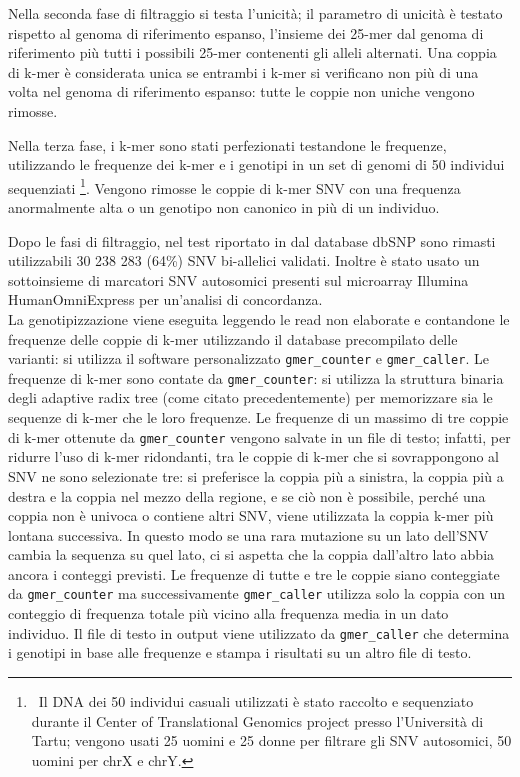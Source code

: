 \documentclass[../main.tex]{subfiles}
\begin{document}
Nella seconda fase di filtraggio si testa l'unicità; il parametro di unicità è testato rispetto al genoma di riferimento espanso, l'insieme dei 25-mer dal genoma di riferimento più tutti i possibili 25-mer contenenti gli alleli alternati. Una coppia di k-mer è considerata unica se entrambi i k-mer si verificano non più di una volta nel genoma di riferimento espanso: tutte le coppie non uniche vengono rimosse.

Nella terza fase, i k-mer sono stati perfezionati testandone le frequenze, utilizzando le frequenze dei k-mer e i genotipi in un set di genomi di 50 individui sequenziati \footnote{\ Il DNA dei 50 individui casuali utilizzati è stato raccolto e sequenziato durante il Center of Translational Genomics project presso l'Università di Tartu; vengono usati 25 uomini e 25 donne per filtrare gli SNV autosomici, 50 uomini per chrX e chrY. }. Vengono rimosse le coppie di k-mer SNV con una frequenza anormalmente alta o un genotipo non canonico in più di un individuo.

Dopo le fasi di filtraggio, nel test riportato in \cite{pajuste2017fastgt} dal database dbSNP sono rimasti utilizzabili 30 238 283 (64\%) SNV bi-allelici validati. Inoltre è stato usato un sottoinsieme di marcatori SNV autosomici presenti sul microarray Illumina HumanOmniExpress per un'analisi di concordanza.  \\

\noindent
La genotipizzazione viene eseguita leggendo le read non elaborate e contandone le frequenze delle coppie di k-mer utilizzando il database precompilato delle varianti: si utilizza il software personalizzato \texttt{gmer\_counter} e \texttt{gmer\_caller}. Le frequenze di k-mer sono contate da \texttt{gmer\_counter}: si utilizza la struttura binaria degli adaptive radix tree (come citato precedentemente) per memorizzare sia le sequenze di k-mer che le loro frequenze. Le frequenze di un massimo di tre coppie di k-mer ottenute da \texttt{gmer\_counter} vengono salvate in un file di testo; infatti, per ridurre l'uso di k-mer ridondanti, tra le coppie di k-mer che si sovrappongono al SNV ne sono selezionate tre: si preferisce la coppia più a sinistra, la coppia più a destra e la coppia nel mezzo della regione, e se ciò non è possibile, perché una coppia non è univoca o contiene altri SNV, viene utilizzata la coppia k-mer più lontana successiva. In questo modo se una rara mutazione su un lato dell'SNV cambia la sequenza su quel lato, ci si aspetta che la coppia dall'altro lato abbia ancora i conteggi previsti. Le frequenze di tutte e tre le coppie siano conteggiate da \texttt{gmer\_counter} ma successivamente \texttt{gmer\_caller} utilizza solo la coppia con un conteggio di frequenza totale più vicino alla frequenza media in un dato individuo. Il file di testo in output viene utilizzato da \texttt{gmer\_caller} che determina i genotipi in base alle frequenze e stampa i risultati su un altro file di testo. 
\end{document}
